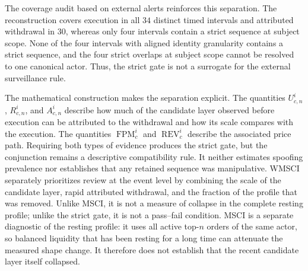 \documentclass[11pt]{article}
\newenvironment{review}{\begingroup\color{blue}}{\endgroup}
\begin{document}
\begin{review}The coverage audit based on external alerts\end{review} reinforces this separation. The reconstruction covers execution in all $34$ distinct timed
intervals and attributed withdrawal in $30$, whereas only four intervals contain a strict sequence at subject scope. None of
the four \begin{review}intervals with aligned identity granularity\end{review} contains a strict sequence, and \begin{review}the four strict overlaps at subject scope\end{review} cannot be resolved
to one canonical actor. Thus, the strict gate is not a surrogate for the external surveillance rule.

The mathematical construction makes the separation explicit. The quantities $U^{i}_{c,n}$, $R^{i}_{c,n}$, and
$A^{i}_{c,n}$ describe how much of \begin{review}the candidate layer observed before execution\end{review} can be attributed to the withdrawal and how its scale
compares with the execution. The quantities $\operatorname{FPM}^{i}_{c}$ and $\operatorname{REV}^{i}_{c}$ describe the
associated price path. Requiring both types of evidence produces the strict gate, but the conjunction remains a descriptive
compatibility rule. It neither estimates spoofing prevalence nor establishes that any retained sequence was manipulative.
\begin{review}WMSCI separately prioritizes review at the event level by combining the scale of the candidate layer, rapid attributed withdrawal, and the fraction of the profile that was removed.\end{review} Unlike MSCI, it is not \begin{review}a measure of collapse in the complete resting profile\end{review}; unlike the strict gate, it is
not a pass--fail condition.
MSCI is \begin{review}a separate diagnostic of the resting profile\end{review}: it uses \begin{review}all active top-$n$ orders of the same actor\end{review}, so \begin{review}balanced liquidity that has been resting for a long time\end{review}
can attenuate the measured shape change. It therefore does not establish that the recent candidate layer itself collapsed.
\end{document}
